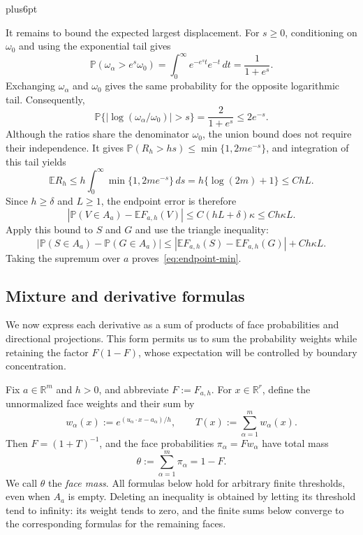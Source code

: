 \documentclass[11pt,letterpaper,twoside,leqno]{article}
\makeatletter
\theoremstyle{bookplain}
\theoremstyle{bookremark}
\renewenvironment{proof}[1][\proofname]{\par
  \pushQED{\qed}\normalfont\topsep6pt plus6pt\relax
  \trivlist\item[\hskip\labelsep\bfseries #1\@addpunct{.}]\ignorespaces
}{\popQED\endtrivlist\@endpefalse}
\newcommand{\E}{\mathbb E}
\newcommand{\Pp}{\mathbb P}
\newcommand{\R}{\mathbb R}
\makeatother
\begin{document}
\begin{proof}[Proof of Lemma~\ref{lem:endpoint}]
It remains to bound the expected largest displacement. For $s\ge0$,
conditioning on $\omega_0$ and using the exponential tail gives
\[
 \Pp(\omega_\alpha>e^s\omega_0)
 =\int_0^\infty e^{-e^s t}e^{-t}\,dt
 =\frac1{1+e^s}.
\]
Exchanging $\omega_\alpha$ and $\omega_0$ gives the same probability for
the opposite logarithmic tail. Consequently,
\[
 \Pp\{|\log(\omega_\alpha/\omega_0)|>s\}
 =\frac2{1+e^s}\le2e^{-s}.
\]
Although the ratios share the denominator $\omega_0$, the union bound
does not require their independence. It gives
$\Pp(R_h>hs)\le\min\{1,2me^{-s}\}$, and integration of this tail yields
\[
 \E R_h
 \le h\int_0^\infty\min\{1,2me^{-s}\}\,ds
 =h\{\log(2m)+1\}\le ChL.
\]
Since $h\ge\delta$ and $L\ge1$, the endpoint error is therefore
\[
 |\Pp(V\in A_a)-\E F_{a,h}(V)|
 \le C(hL+\delta)\kappa\le Ch\kappa L.
\]
Apply this bound to $S$ and $G$ and use the triangle inequality:
\[
 |\Pp(S\in A_a)-\Pp(G\in A_a)|
 \le|\E F_{a,h}(S)-\E F_{a,h}(G)|+Ch\kappa L.
\]
Taking the supremum over $a$ proves~\eqref{eq:endpoint-min}.
\end{proof}

\subsection{\texorpdfstring{Mixture and derivative formulas}{Mixture and derivative formulas}}\label{appx-sec:mixture}

We now express each derivative as a sum of products of face
probabilities and directional projections. This form permits us to
sum the probability weights while retaining the factor $F(1-F)$,
whose expectation will be controlled by boundary concentration.

Fix $a\in\R^m$ and $h>0$, and abbreviate $F:=F_{a,h}$.
For $x\in\R^r$, define the unnormalized face weights and their sum by
\[
 w_\alpha(x):=e^{(u_\alpha\cdot x-a_\alpha)/h},
 \qquad T(x):=\sum_{\alpha=1}^m w_\alpha(x).
\]
Then $F=(1+T)^{-1}$, and the face probabilities
$\pi_\alpha=Fw_\alpha$ have total mass
\[
 \theta:=\sum_{\alpha=1}^m\pi_\alpha=1-F.
\]
We call $\theta$ the \emph{face mass}. All formulas below hold for
arbitrary finite thresholds, even when $A_a$ is empty. Deleting
an inequality is obtained by letting its threshold tend to infinity:
its weight tends to zero, and the finite sums below converge to the
corresponding formulas for the remaining faces.
\end{document}
